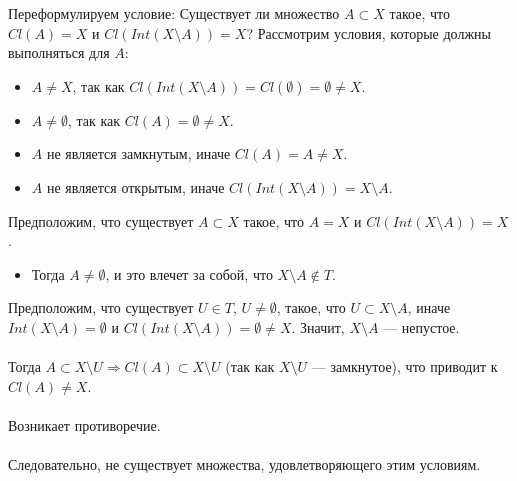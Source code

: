 \documentclass{article}
\begin{document}
        Переформулируем условие:  
        Существует ли множество $A \subset X$ такое, что $Cl(A) = X$ и $Cl(Int(X \setminus A)) = X$?
        Рассмотрим условия, которые должны выполняться для $A$:
        \begin{itemize}
            \item $A \neq X$, так как $Cl(Int(X \setminus A)) = Cl(\emptyset) = \emptyset \neq X$.
            \item $A \neq \emptyset$, так как $Cl(A) = \emptyset \neq X$.
            \item $A$ не является замкнутым, иначе $Cl(A) = A \neq X$.
            \item $A$ не является открытым, иначе $Cl(Int(X \setminus A)) = X \setminus A$.
        \end{itemize}
        
        Предположим, что существует $A \subset X$ такое, что $A = X$ и $Cl(Int(X \setminus A)) = X$.
        
        \begin{itemize}
            \item Тогда $A \neq \emptyset$, и это влечет за собой, что $X \setminus A \notin T$.
        \end{itemize} 
        Предположим, что существует $U \in T$, $U \neq \emptyset$, такое, что $U \subset X \setminus A$, иначе $Int(X \setminus A) = \emptyset$ и $Cl(Int(X \setminus A)) = \emptyset \neq X$.  
        Значит, $X \setminus A$ — непустое. \\ \\
        Тогда $A \subset X \setminus U \Rightarrow Cl(A) \subset X \setminus U$ (так как $X \setminus U$ — замкнутое), что приводит к $Cl(A) \neq X$. \\ \\ 
        Возникает противоречие.\\ \\
        Следовательно, не существует множества, удовлетворяющего этим условиям.
                                
                               
                
\end{document}
